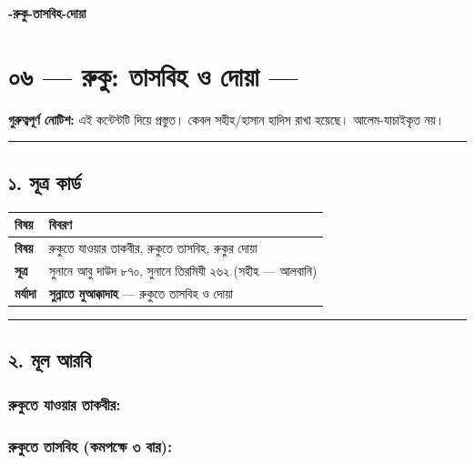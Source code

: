

\begin{center}{\Large\bfseries\color{emerald} -রুকু-তাসবিহ-দোয়া}\end{center}
\vspace{1em}
\section*{০৬ — রুকু: তাসবিহ ও দোয়া — \textit{  }}

\begin{warnbox}
 \textbf{গুরুত্বপূর্ণ নোটিশ:} এই কন্টেন্টটি  দিয়ে প্রস্তুত। কেবল সহীহ/হাসান হাদিস রাখা হয়েছে। আলেম-যাচাইকৃত নয়।
\end{warnbox}

\medskip\hrule\medskip

\subsection*{১. সূত্র কার্ড}

\begin{table}[h]\centering\small
\begin{tabular}{ll}
বিষয় & বিবরণ \\
\hline
\textbf{বিষয়} & রুকুতে যাওয়ার তাকবীর, রুকুতে তাসবিহ, রুকুর দোয়া \\
\textbf{সূত্র} & সুনানে আবু দাউদ ৮৭০, সুনানে তিরমিযী ২৬২ (সহীহ — আলবানি) \\
\textbf{মর্যাদা} & \textbf{সুন্নাতে মুআক্কাদাহ} — রুকুতে তাসবিহ ও দোয়া \\
\hline
\end{tabular}
\end{table}

\medskip\hrule\medskip

\subsection*{২. মূল আরবি}

\subsubsection*{\textbf{রুকুতে যাওয়ার তাকবীর:}}
\begin{center}\end{center}

\subsubsection*{\textbf{রুকুতে তাসবিহ (কমপক্ষে ৩ বার):}}
\begin{center}\end{center}

